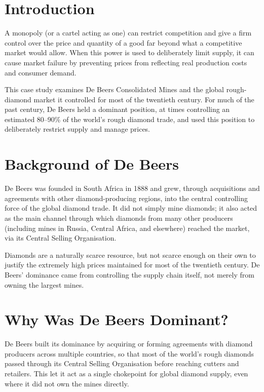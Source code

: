 




\section{Introduction}
A monopoly (or a cartel acting as one) can restrict competition and give a firm control over the price and quantity of a good far beyond what a competitive market would allow. When this power is used to deliberately limit supply, it can cause market failure by preventing prices from reflecting real production costs and consumer demand.

This case study examines De Beers Consolidated Mines and the global rough-diamond market it controlled for most of the twentieth century. For much of the past century, De Beers held a dominant position, at times controlling an estimated 80--90\% of the world's rough diamond trade, and used this position to deliberately restrict supply and manage prices.

\section{Background of De Beers}
De Beers was founded in South Africa in 1888 and grew, through acquisitions and agreements with other diamond-producing regions, into the central controlling force of the global diamond trade. It did not simply mine diamonds; it also acted as the main channel through which diamonds from many other producers (including mines in Russia, Central Africa, and elsewhere) reached the market, via its Central Selling Organisation.

Diamonds are a naturally scarce resource, but not scarce enough on their own to justify the extremely high prices maintained for most of the twentieth century. De Beers' dominance came from controlling the supply chain itself, not merely from owning the largest mines.

\section{Why Was De Beers Dominant?}
De Beers built its dominance by acquiring or forming agreements with diamond producers across multiple countries, so that most of the world's rough diamonds passed through its Central Selling Organisation before reaching cutters and retailers. This let it act as a single chokepoint for global diamond supply, even where it did not own the mines directly.

